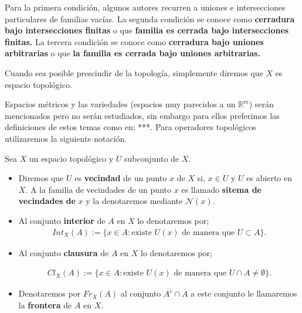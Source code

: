 \begin{ob}
Para la primera condición, algunos autores recurren a uniones e intersecciones particulares de familias vacías. La segunda condición se conoce como \textbf{cerradura bajo intersecciones finitas} o que \textbf{familia es cerrada bajo intersecciones finitas.} La tercera condición se conoce como \textbf{cerradura bajo uniones arbitrarias} o que \textbf{la familia es cerrada bajo uniones arbitrarias.}
\end{ob}

\begin{cn}
Cuando sea posible prescindir de la topología, simplemente diremos que $X$ es espacio topológico. 
\end{cn}

Espacios métricos y las variedades (espacios muy parecidos a un $\mathbb{R}^m$) serán mencionados pero no serán estudiados, sin embargo para ellos preferimos las definiciones de estos temas como en; ***. Para operadores topológicos utilizaremos la siguiente notación. 

\begin{df}
Sea $X$ un espacio topológico y $U$ subconjunto de $X$.

\begin{itemize}
	\item Diremos que $U$ es \textbf{vecindad} de un punto $x$ de $X$ si, $x \in U$ y $U$ es abierto en $X$. A la familia de  vecindades de un punto $x$ es llamado \textbf{sitema de vecindades de} $x$ y la denotaremos mediante $\mathcal{N}(x)$.
 
 \item Al conjunto \textbf{interior} de $A$ en $X$ lo denotaremos por; 
	\begin{align*}
	Int_X(A):=\{x \in A: \text{existe } U(x) \text{ de manera que } U \subset A\}.
	\end{align*} 

 \item  Al conjunto  \textbf{clausura} de $A$ en $X$ lo denotaremos por; 
   
	\begin{align*}
	Cl_X(A):=\{x \in A: \text{existe } U(x) \text{ de manera que } U \cap A \neq \emptyset\}.
	\end{align*}
 
 \item Denotaremos por $Fr_X(A)$ al conjunto $\overline{A^c} \cap \overline{A} $ a este conjunto le llamaremos la 
  \textbf{frontera} de $A$ en $X$.
 \end{itemize}
 
\end{df}

